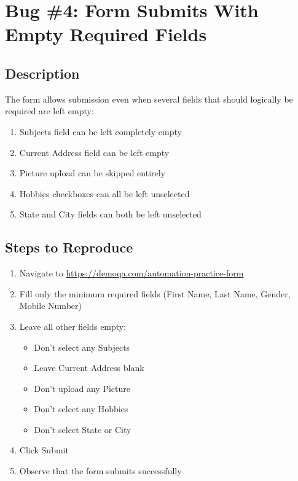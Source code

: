 \section{Bug \#4: Form Submits With Empty Required Fields}


\subsection*{Description}
The form allows submission even when several fields that should logically be required are left empty:
\begin{enumerate}
    \item Subjects field can be left completely empty
    \item Current Address field can be left empty
    \item Picture upload can be skipped entirely
    \item Hobbies checkboxes can all be left unselected
    \item State and City fields can both be left unselected
\end{enumerate}

\subsection*{Steps to Reproduce}
\begin{enumerate}
    \item Navigate to \url{https://demoqa.com/automation-practice-form}
    \item Fill only the minimum required fields (First Name, Last Name, Gender, Mobile Number)
    \item Leave all other fields empty:
    \begin{itemize}
        \item Don't select any Subjects
        \item Leave Current Address blank
        \item Don't upload any Picture
        \item Don't select any Hobbies
        \item Don't select State or City
    \end{itemize}
    \item Click Submit
    \item Observe that the form submits successfully
\end{enumerate}

